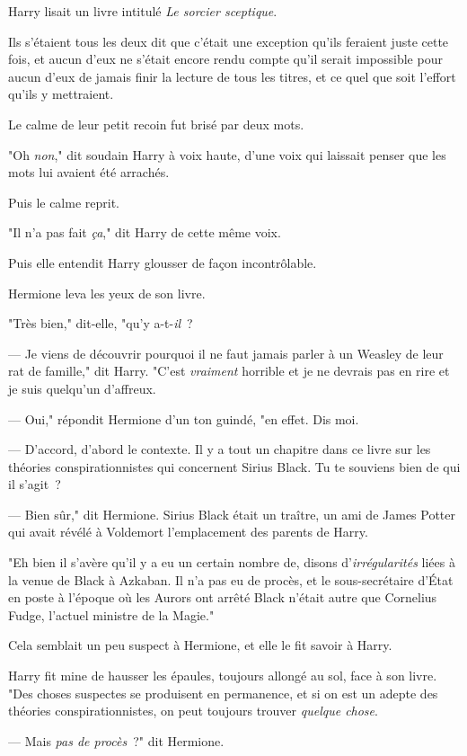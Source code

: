 Harry lisait un livre intitulé \emph{Le sorcier sceptique}.

Ils s'étaient tous les deux dit que c'était une exception qu'ils feraient juste cette fois, et aucun d'eux ne s'était encore rendu compte qu'il serait impossible pour aucun d'eux de jamais finir la lecture de tous les titres, et ce quel que soit l'effort qu'ils y mettraient.

Le calme de leur petit recoin fut brisé par deux mots.

"Oh \emph{non}," dit soudain Harry à voix haute, d'une voix qui laissait penser que les mots lui avaient été arrachés.

Puis le calme reprit.

"Il n'a pas fait \emph{ça}," dit Harry de cette même voix.

Puis elle entendit Harry glousser de façon incontrôlable.

Hermione leva les yeux de son livre.

"Très bien," dit-elle, "qu'y a-t-\emph{il}~?

--- Je viens de découvrir pourquoi il ne faut jamais parler à un Weasley de leur rat de famille," dit Harry. "C'est \emph{vraiment} horrible et je ne devrais pas en rire et je suis quelqu'un d'affreux.

--- Oui," répondit Hermione d'un ton guindé, "en effet. Dis moi.

--- D'accord, d'abord le contexte. Il y a tout un chapitre dans ce livre sur les théories conspirationnistes qui concernent Sirius Black. Tu te souviens bien de qui il s'agit~?

--- Bien sûr," dit Hermione. Sirius Black était un traître, un ami de James Potter qui avait révélé à Voldemort l'emplacement des parents de Harry.

"Eh bien il s'avère qu'il y a eu un certain nombre de, disons d'\emph{irrégularités} liées à la venue de Black à Azkaban. Il n'a pas eu de procès, et le sous-secrétaire d'État en poste à l'époque où les Aurors ont arrêté Black n'était autre que Cornelius Fudge, l'actuel ministre de la Magie."

Cela semblait un peu suspect à Hermione, et elle le fit savoir à Harry.

Harry fit mine de hausser les épaules, toujours allongé au sol, face à son livre. "Des choses suspectes se produisent en permanence, et si on est un adepte des théories conspirationnistes, on peut toujours trouver \emph{quelque chose}.

--- Mais \emph{pas de procès}~?" dit Hermione.


